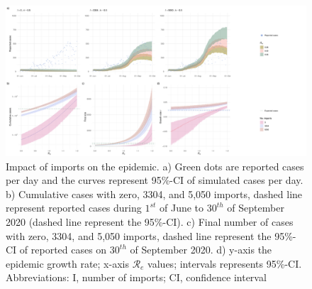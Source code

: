 \documentclass[10pt, a4paper, twoside]{article}
\begin{document}
\begin{multicols}{2}
\begin{figure}[h!]
\centering
\includegraphics[scale=0.3]{Figure2_2021-04-19.pdf}
\caption{Impact of imports on the epidemic.
a) Green dots are reported cases per day and the curves represent 95\%-CI of simulated cases per day.
b) Cumulative cases with zero, 3304, and 5,050 imports, dashed line represent reported cases during $1^{st}$ of June to $30^{th}$ of September 2020 (dashed line represent the 95\%-CI). 
c) Final number of cases with zero, 3304, and 5,050 imports, dashed line represent the 95\%-CI of reported cases on $30^{th}$ of September 2020.
d) y-axis the epidemic growth rate; x-axis $\mathcal{R}_e$ values; intervals represents 95\%-CI.
Abbreviations: I, number of imports; CI, confidence interval}
\label{f2}
\end{figure}
\end{multicols}
\begin{landscape}
\global\pdfpageattr\expandafter{\the\pdfpageattr/Rotate 90}
}
\end{landscape}
\end{document}
